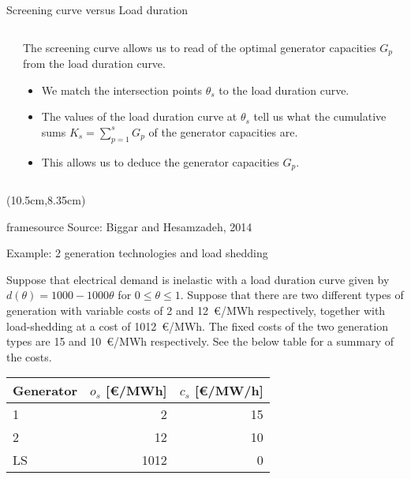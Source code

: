 \documentclass[10pt,aspectratio=169,dvipsnames]{beamer}
\newcommand{\ra}[1]{\renewcommand{\arraystretch}{#1}}
\newcommand{\source}[1]{\begin{textblock*}{5cm}(10.5cm,8.35cm)
    \begin{beamercolorbox}[ht=0.5cm,right]{framesource}
        \usebeamerfont{framesource}\usebeamercolor[fg]{framesource} Source: {#1}
    \end{beamercolorbox}
\end{textblock*}}
\let\olditem\item
\renewcommand{\item}{%
\olditem\vspace{5pt}}
\begin{document}
\begin{frame}{Screening curve versus Load duration}

  \begin{columns}[T]
  \begin{column}{7cm}
  \centering
  \end{column}
  \begin{column}{6cm}

      The screening curve allows us to read of the optimal generator capacities $G_p$ from the load duration curve.

    \begin{itemize}

    \item We match the intersection points $\theta_s$ to the load duration curve.
    \item The values of the load duration curve at $\theta_s$ tell us what the cumulative sums $K_s = \sum_{p=1}^s G_p$  of the generator capacities are.
      \item This allows us to deduce the generator capacities $G_p$.
    \end{itemize}

  \end{column}
  \end{columns}
  \source{Biggar and Hesamzadeh, 2014}
\end{frame}


\begin{frame}{Example: 2 generation technologies and load shedding}


Suppose that electrical demand is inelastic with a  load duration curve given by $d(\theta)=1000-1000\theta$ for $0\leq \theta \leq 1$. Suppose that there are two different types of generation with variable costs of 2 and 12~\euro/MWh respectively, together with load-shedding at a cost of 1012~\euro/MWh. The fixed costs of the two generation types are 15 and 10~\euro/MWh respectively. See the below table for a summary of the costs.



  \ra{1.1}
  \begin{table}[!h]
    \begin{tabular}{lrr}
      \toprule
      Generator & $o_s$ [\euro/MWh] &  $c_s$ [\euro/MW/h] \\
      \midrule
      1 & 2 & 15 \\
      2 & 12 & 10 \\
      LS & 1012 & 0 \\
      \bottomrule
    \end{tabular}
  \end{table}


\end{frame}
\end{document}
